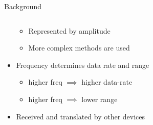 \documentclass{beamer}
\begin{document}
\begin{frame}{Background}
\begin{columns}
\begin{column}{0.6\textwidth}
\begin{itemize}
          \begin{itemize}
            \item Represented by amplitude
            \item More complex methods are used
          \end{itemize}
        \item Frequency determines data rate and range
        \begin{itemize}
          \item higher freq $\implies$ higher data-rate
          \item higher freq $\implies$ lower range
        \end{itemize}
        \item Received and translated by other devices
      \end{itemize}
    \end{column}
  \end{columns}
\end{frame}
\end{document}
